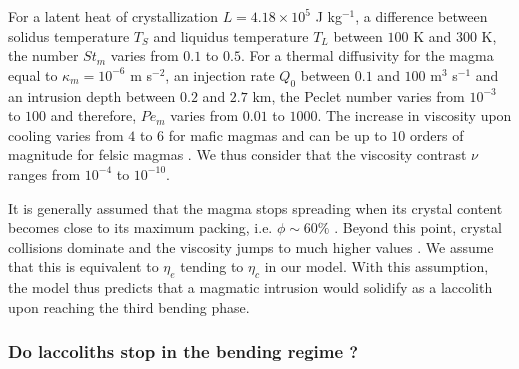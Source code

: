 For a latent heat of crystallization $L = 4.18\times10^5$ J kg$^{-1}$,
a   difference  between   solidus  temperature   $T_S$  and   liquidus
temperature  $T_L$ between  $100$ K  and  $300$ K,  the number  $St_m$
varies from $0.1$  to $0.5$.  For a thermal diffusivity  for the magma
equal  to $\kappa_m=  10^{-6}$  m s$^{-2}$,  an  injection rate  $Q_0$
between $0.1$ and $100$ m$^3$  s$^{-1}$ and an intrusion depth between
$0.2$ and $2.7$  km, the Peclet number varies from  $10^{-3}$ to $100$
and therefore,  $Pe_m$ varies from  $0.01$ to $1000$. The  increase in
viscosity upon cooling varies from $4$ to $6$ for mafic magmas and can
be   up   to   $10$   orders    of   magnitude   for   felsic   magmas
\citep{Anonymous:CZVBrBvv,Lejeune:1995fc,Giordano:2008em,Diniega:2013eh}.
We  thus  consider  that  the viscosity  contrast  $\nu$  ranges  from
$10^{-4}$ to $10^{-10}$.

It  is generally  assumed  that  the magma  stops  spreading when  its
crystal   content  becomes   close  to   its  maximum   packing,  i.e.
$\phi  \sim  60\%$   \citep{Pinkerton:1992fwa}.   Beyond  this  point,
crystal collisions  dominate and  the viscosity  jumps to  much higher
values \citep{Lejeune:1995fc,Giordano:2008em}.  We assume that this is
equivalent to  $\eta_e$ tending to  $\eta_c$ in our model.   With this
assumption, the  model thus predicts  that a magmatic  intrusion would
solidify as a laccolith upon reaching the third bending phase.

\subsubsection*{Do laccoliths stop in the bending regime ?}
\label{C4-sec:range-valu-dimens}

